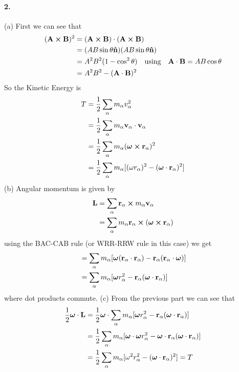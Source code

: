 \documentclass[../hw.tex]{subfiles}
\begin{document}
\paragraph*{2.} (a) First we can see that
\begin{align*}
    (\vb A \cross \vb B)^2 &= (\vb A \cross \vb B) \cdot (\vb A \cross \vb B) \\
    &= (A B \sin \theta \vu n) (A B \sin \theta \vu n) \\
    &= A^2 B^2 (1 - \cos^2 \theta) \qusing \vb A \cdot \vb B = A B \cos \theta \\
    &= A^2 B^2 - (\vb A \cdot \vb B)^2
\end{align*}
So the Kinetic Energy is
\begin{align*}
    T &= \frac{1}{2} \sum_\alpha m_\alpha v_\alpha^2 \\
    &= \frac{1}{2} \sum_\alpha m_\alpha \vb v_\alpha \cdot \vb v_\alpha \\
    &= \frac{1}{2} \sum_\alpha m_\alpha (\vb*\omega \cross \vb r_\alpha)^2 \\
    &= \frac{1}{2} \sum_\alpha m_\alpha [(\omega r_\alpha)^2 - (\vb*\omega \cdot \vb r_\alpha)^2] 
\end{align*}
(b) Angular momentum is given by
\begin{align*}
    \vb L &= \sum_\alpha \vb r_\alpha \cross m_\alpha \vb v_\alpha \\
    &= \sum_\alpha m_\alpha  \vb r_\alpha \cross (\vb*\omega \cross \vb r_\alpha)
\end{align*}
using the BAC-CAB rule (or WRR-RRW rule in this case) we get
\begin{align*}
    &= \sum_\alpha m_\alpha [\vb*\omega(\vb r_\alpha \cdot \vb r_\alpha) - \vb r_\alpha(\vb r_\alpha \cdot \vb*\omega)] \\
    &= \sum_\alpha m_\alpha [\vb*\omega r_\alpha^2 - \vb r_\alpha(\vb*\omega \cdot \vb r_\alpha)]
\end{align*}
where dot products commute. 
(c) From the previous part we can see that
\begin{align*}
    \frac{1}{2} \vb*\omega \cdot \vb L &= \frac{1}{2} \vb*\omega \cdot \sum_\alpha m_\alpha [\vb*\omega r_\alpha^2 - \vb r_\alpha(\vb*\omega \cdot \vb r_\alpha)] \\
    &= \frac{1}{2} \sum_\alpha m_\alpha [\vb*\omega \cdot \vb*\omega r_\alpha^2 - \vb*\omega \cdot \vb r_\alpha(\vb*\omega \cdot \vb r_\alpha)] \\
    &= \frac{1}{2} \sum_\alpha m_\alpha [\omega^2 r_\alpha^2 - (\vb*\omega \cdot \vb r_\alpha)^2] = T
\end{align*}
\end{document}
